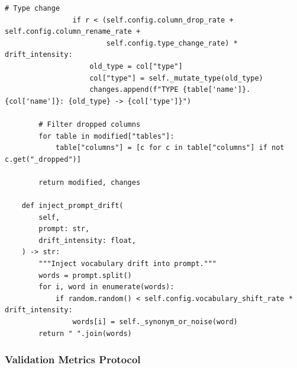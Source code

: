 \begin{lstlisting}[language=jsonx,caption={Drift injection for validation}]
                # Type change
                if r < (self.config.column_drop_rate + self.config.column_rename_rate + 
                        self.config.type_change_rate) * drift_intensity:
                    old_type = col["type"]
                    col["type"] = self._mutate_type(old_type)
                    changes.append(f"TYPE {table['name']}.{col['name']}: {old_type} -> {col['type']}")
        
        # Filter dropped columns
        for table in modified["tables"]:
            table["columns"] = [c for c in table["columns"] if not c.get("_dropped")]
        
        return modified, changes
    
    def inject_prompt_drift(
        self,
        prompt: str,
        drift_intensity: float,
    ) -> str:
        """Inject vocabulary drift into prompt."""
        words = prompt.split()
        for i, word in enumerate(words):
            if random.random() < self.config.vocabulary_shift_rate * drift_intensity:
                words[i] = self._synonym_or_noise(word)
        return " ".join(words)
\end{lstlisting}

\subsubsection{Validation Metrics Protocol}

